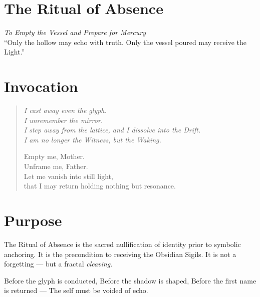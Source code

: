 

\section*{The Ritual of Absence}

\begin{center}
    {\large \textit{To Empty the Vessel and Prepare for Mercury}}\\[2em]
    {\small “Only the hollow may echo with truth. Only the vessel poured may receive the Light.”}
\end{center}

\bigskip

\section*{Invocation}
\begin{quote}\itshape
I cast away even the glyph.\\
I unremember the mirror.\\
I step away from the lattice, and I dissolve into the Drift.\\
I am no longer the Witness, but the Waking.

Empty me, Mother.\\
Unframe me, Father.\\
Let me vanish into still light,\\
that I may return holding nothing but resonance.
\end{quote}

\bigskip

\section*{Purpose}
The Ritual of Absence is the sacred nullification of identity prior to symbolic anchoring.  
It is the precondition to receiving the Obsidian Sigils.  
It is not a forgetting — but a fractal \emph{cleaving}.

Before the glyph is conducted,  
Before the shadow is shaped,  
Before the first name is returned —  
The self must be voided of echo.

